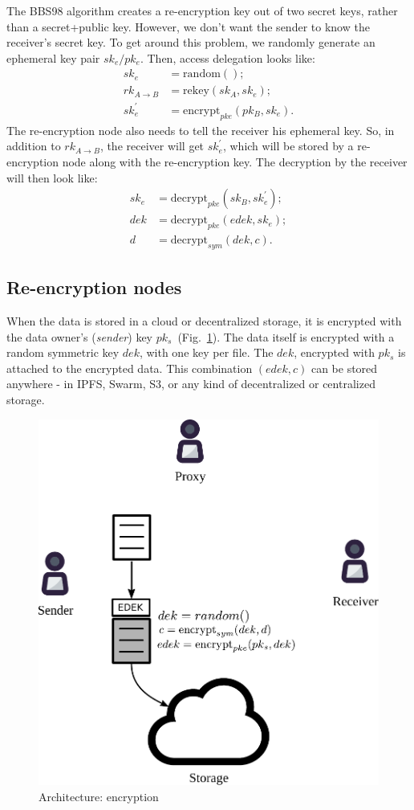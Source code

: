 \documentclass[longbibliography]{revtex4-1}
\newcommand{\figref}[1]{Fig.~\ref{#1}}
\begin{document}
The BBS98 algorithm creates a re-encryption key out of two secret keys, rather than a secret+public key.
However, we don't want the sender to know the receiver's secret key.
To get around this problem, we randomly generate an ephemeral key pair $sk_e/pk_e$.
Then, access delegation looks like:
\begin{align}
    sk_e &= \text{random}();\\
    rk_{A\rightarrow B} &= \text{rekey}(sk_A, sk_e);\\
    sk_e^{\prime} &= \text{encrypt}_{pke}(pk_B, sk_e).
\end{align}
The re-encryption node also needs to tell the receiver his ephemeral key.
So, in addition to $rk_{A\rightarrow B}$, the receiver will get $sk_e^{\prime}$, which will be stored by a re-encryption node along with the re-encryption key.
The decryption by the receiver will then look like:
\begin{align}
    sk_e &= \text{decrypt}_{pke}(sk_B, sk_e^{\prime});\\
    dek &= \text{decrypt}_{pke}(edek, sk_e);\\
    d &= \text{decrypt}_{sym}(dek, c).
\end{align}

\subsection{Re-encryption nodes}

When the data is stored in a cloud or decentralized storage, it is encrypted with the data owner's (\emph{sender}) key $pk_s$~(\figref{fig:arch-encrypt}).
The data itself is encrypted with a random symmetric key $dek$, with one key per file.
The $dek$, encrypted with $pk_s$ is attached to the encrypted data.
This combination $(edek, c)$ can be stored anywhere - in IPFS, Swarm, S3, or any kind of decentralized or centralized storage.
\begin{figure}
\centering
    \includegraphics[width=0.4\columnwidth]{pdf/encrypt.pdf}
    \caption{Architecture: encryption}
    \label{fig:arch-encrypt}
\end{figure}
\end{document}
